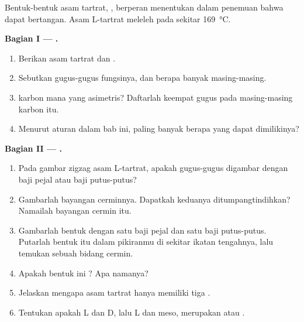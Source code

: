 \begin{problem}
\label{pb:g12:stereochemistry:1}
Bentuk-bentuk asam tartrat, , berperan
menentukan dalam penemuan bahwa  dapat bertangan. Asam L-tartrat
meleleh pada sekitar \qty{169}{\celsius}.

\medskip
\noindent\textbf{Bagian I --- .}
\begin{enumerate}
  \item Berikan  asam tartrat dan .
  \item Sebutkan gugus-gugus fungsinya, dan berapa banyak masing-masing.
  \item {} karbon mana yang asimetris? Daftarlah keempat gugus pada
        masing-masing karbon itu.
  \item Menurut aturan dalam bab ini, paling banyak berapa 
        yang dapat dimilikinya?
\end{enumerate}

\medskip
\noindent\textbf{Bagian II --- .}
\begin{enumerate}[resume]
  \item Pada gambar zigzag asam L-tartrat, apakah gugus-gugus 
        digambar dengan baji pejal atau baji putus-putus?
  \item Gambarlah bayangan cerminnya. Dapatkah keduanya
        ditumpangtindihkan? Namailah bayangan cermin itu.
  \item Gambarlah bentuk dengan satu baji pejal dan satu baji
        putus-putus. Putarlah bentuk itu dalam pikiranmu di sekitar
        ikatan tengahnya, lalu temukan sebuah bidang cermin.
  \item Apakah bentuk ini ? Apa namanya?
  \item Jelaskan mengapa asam tartrat hanya memiliki tiga .
  \item Tentukan apakah L dan D, lalu L dan meso, merupakan 
        atau .
\end{enumerate}


\end{problem}
